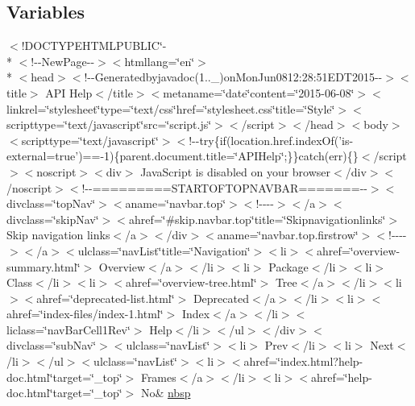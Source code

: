 \subsection*{Variables}
\begin{DoxyCompactItemize}
\item 
$<$!D\-O\-C\-T\-Y\-P\-E\-H\-T\-M\-L\-P\-U\-B\-L\-I\-C\char`\"{}-\/\\*
$<$!-\/-\/New\-Page-\/-\/$>$$<$htmllang=\char`\"{}en\char`\"{}$>$\\*
$<$head$>$$<$!-\/-\/Generatedbyjavadoc(1..\-\_)on\-Mon\-Jun0812\-:28\-:51\-E\-D\-T2015-\/-\/$>$$<$title$>$ A\-P\-I Help$<$/title$>$$<$metaname=\char`\"{}date\char`\"{}content=\char`\"{}2015-\/06-\/08\char`\"{}$>$$<$linkrel=\char`\"{}stylesheet\char`\"{}type=\char`\"{}text/css\char`\"{}href=\char`\"{}stylesheet.\-css\char`\"{}title=\char`\"{}\-Style\char`\"{}$>$$<$scripttype=\char`\"{}text/javascript\char`\"{}src=\char`\"{}script.\-js\char`\"{}$>$$<$/script$>$$<$/head$>$$<$body$>$$<$scripttype=\char`\"{}text/javascript\char`\"{}$>$$<$!-\/-\/try\{if(location.\-href.\-index\-Of('is-\/external=true')==-\/1)\{parent.\-document.\-title=\char`\"{}\-A\-P\-I\-Help\char`\"{};\}\}catch(err)\{\}$<$/script$>$$<$noscript$>$$<$div$>$ Java\-Script is disabled on your browser$<$/div$>$$<$/noscript$>$$<$!-\/-\/=========\-S\-T\-A\-R\-T\-O\-F\-T\-O\-P\-N\-A\-V\-B\-A\-R=======-\/-\/$>$$<$divclass=\char`\"{}top\-Nav\char`\"{}$>$$<$aname=\char`\"{}navbar.\-top\char`\"{}$>$$<$!-\/-\/-\/-\/$>$$<$/a$>$$<$divclass=\char`\"{}skip\-Nav\char`\"{}$>$$<$ahref=\char`\"{}\#skip.\-navbar.\-top\char`\"{}title=\char`\"{}\-Skipnavigationlinks\char`\"{}$>$ Skip navigation links$<$/a$>$$<$/div$>$$<$aname=\char`\"{}navbar.\-top.\-firstrow\char`\"{}$>$$<$!-\/-\/-\/-\/$>$$<$/a$>$$<$ulclass=\char`\"{}nav\-List\char`\"{}title=\char`\"{}\-Navigation\char`\"{}$>$$<$li$>$$<$ahref=\char`\"{}overview-\/summary.\-html\char`\"{}$>$ Overview$<$/a$>$$<$/li$>$$<$li$>$ Package$<$/li$>$$<$li$>$ Class$<$/li$>$$<$li$>$$<$ahref=\char`\"{}overview-\/tree.\-html\char`\"{}$>$ Tree$<$/a$>$$<$/li$>$$<$li$>$$<$ahref=\char`\"{}deprecated-\/list.\-html\char`\"{}$>$ Deprecated$<$/a$>$$<$/li$>$$<$li$>$$<$ahref=\char`\"{}index-\/files/index-\/1.\-html\char`\"{}$>$ Index$<$/a$>$$<$/li$>$$<$liclass=\char`\"{}nav\-Bar\-Cell1\-Rev\char`\"{}$>$ Help$<$/li$>$$<$/ul$>$$<$/div$>$$<$divclass=\char`\"{}sub\-Nav\char`\"{}$>$$<$ulclass=\char`\"{}nav\-List\char`\"{}$>$$<$li$>$ Prev$<$/li$>$$<$li$>$ Next$<$/li$>$$<$/ul$>$$<$ulclass=\char`\"{}nav\-List\char`\"{}$>$$<$li$>$$<$ahref=\char`\"{}index.\-html?help-\/doc.\-html\char`\"{}target=\char`\"{}\-\_\-top\char`\"{}$>$ Frames$<$/a$>$$<$/li$>$$<$li$>$$<$ahref=\char`\"{}help-\/doc.\-html\char`\"{}target=\char`\"{}\-\_\-top\char`\"{}$>$ No\& \hyperlink{help-doc_8html_af43198c3b54c4bc836554c5ac67d0f12}{nbsp}

\end{DoxyCompactItemize}
